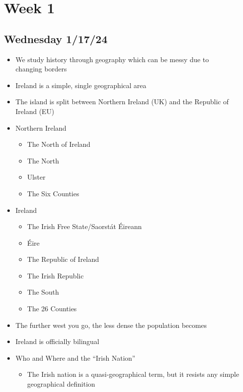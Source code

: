 \documentclass[12pt]{article}
\begin{document}
\tableofcontents
\newpage
    \section{Week 1}
        \subsection{Wednesday 1/17/24}
            \bigskip
            \begin{itemize}
                \item We study history through geography which can be messy due to \\changing borders
                \item Ireland is a simple, single geographical area
                \item The island is split between Northern Ireland (UK) and the Republic of Ireland (EU)
                \item Northern Ireland
                \begin{itemize}
                    \item The North of Ireland
                    \item The North
                    \item Ulster
                    \item The Six Counties
                \end{itemize}
                \item Ireland
                \begin{itemize}
                    \item The Irish Free State/Saorstát Éireann
                    \item Éire
                    \item The Republic of Ireland
                    \item The Irish Republic
                    \item The South
                    \item The 26 Counties
                \end{itemize}
                \item The further west you go, the less dense the population becomes
                \item Ireland is officially bilingual
                \item Who and Where and the ``Irish Nation''
                \begin{itemize}
                    \item The Irish nation is a quasi-geographical term, but it resists any simple geographical definition

\end{itemize}
\end{itemize}
\end{document}
